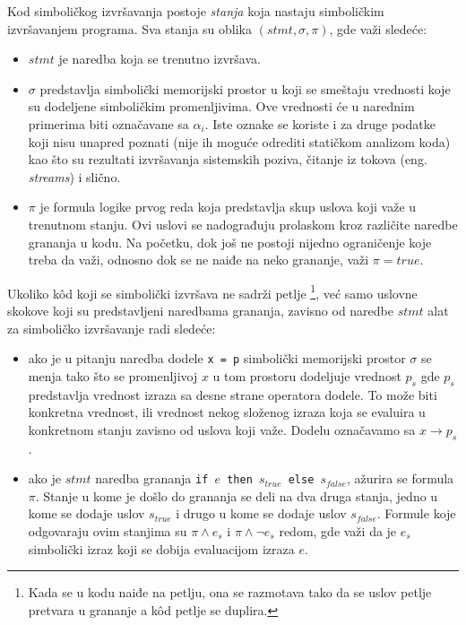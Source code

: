 \documentclass[12pt,oneside]{memoir}
\begin{document}
Kod simboličkog izvršavanja postoje \textit{stanja} koja nastaju simboličkim izvršavanjem programa. Sva stanja su oblika $(stmt, \sigma, \pi)$, gde važi sledeće:

\begin{itemize}
    \item $stmt$ je naredba koja se trenutno izvršava.
    
    \item $\sigma$ predstavlja simbolički memorijski prostor u koji se smeštaju vrednosti koje su dodeljene simboličkim promenljivima. Ove vrednosti će u narednim primerima biti označavane sa $\alpha_i$. Iste oznake se koriste i za druge podatke koji nisu unapred poznati (nije ih moguće odrediti statičkom analizom koda) kao što su rezultati izvršavanja sistemskih poziva, čitanje iz tokova (eng. \textit{streams}) i slično.
    
    \item $\pi$ je formula logike prvog reda koja predstavlja skup uslova koji važe u trenutnom stanju. Ovi uslovi se nadograđuju prolaskom kroz različite naredbe grananja u kodu. Na početku, dok još ne postoji nijedno ograničenje koje treba da važi, odnosno dok se ne naiđe na neko grananje, važi $\pi = true$. 
\end{itemize}

Ukoliko k\^od koji se simbolički izvršava ne sadrži petlje \footnote[2]{Kada se u kodu naiđe na petlju, ona se razmotava tako da se uslov petlje pretvara u grananje a k\^od petlje se duplira.}, već samo uslovne skokove koji su predstavljeni naredbama grananja, zavisno od naredbe $stmt$ alat za simboličko izvršavanje radi sledeće:

\begin{itemize}
    \item ako je u pitanju naredba dodele \texttt{x = p} simbolički memorijski prostor $\sigma$ se menja tako što se promenljivoj $x$ u tom prostoru dodeljuje vrednost $p_s$ gde $p_s$ predstavlja vrednost izraza sa desne strane operatora dodele. To može biti konkretna vrednost, ili vrednost nekog složenog izraza koja se evaluira u konkretnom stanju zavisno od uslova koji važe. Dodelu označavamo sa $x \rightarrow p_s$.
    
    \item ako je $stmt$ naredba grananja \texttt{if $e$ then $s_{true}$ else $s_{false}$}, ažurira se formula $\pi$. Stanje u kome je došlo do grananja se deli na dva druga stanja, jedno u kome se dodaje uslov $s_{true}$ i drugo u kome se dodaje uslov $s_{false}$. Formule koje odgovaraju ovim stanjima su $\pi \land e_s$ i $\pi \land \neg e_s$ redom, gde važi da je $e_s$ simbolički izraz koji se dobija evaluacijom izraza $e$.
\end{itemize}
\end{document}
